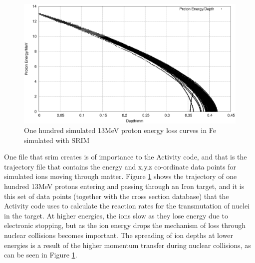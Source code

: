 \begin{figure}
  \begin{center}
    \includegraphics[width=.7\linewidth]{chapters/background_activity/plots/fe_13MeV.eps}
    \caption{One hundred simulated 13MeV proton energy loss curves in Fe simulated with SRIM \cite{srim}}
    \label{fig:fe13traj}
  \end{center}
\end{figure}

One file that \acrshort{srim} creates is of importance to the Activity code, and that is the trajectory file that contains the energy and x,y,z co-ordinate data points for simulated ions moving through matter.  Figure \ref{fig:fe13traj} shows the trajectory of one hundred 13MeV protons entering and passing through an Iron target, and it is this set of data points (together with the cross section database) that the Activity code uses to calculate the reaction rates for the transmutation of nuclei in the target.  At higher energies, the ions slow as they lose energy due to electronic stopping, but as the ion energy drops the mechanism of loss through nuclear collisions becomes important.  The spreading of ion depths at lower energies is a result of the higher momentum transfer during nuclear collisions, as can be seen in Figure \ref{fig:fe13traj}.









